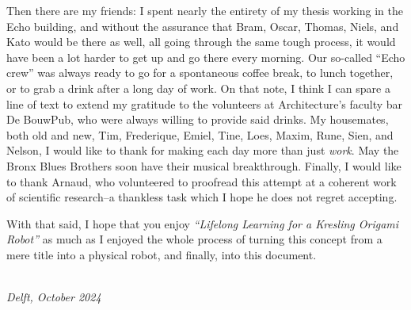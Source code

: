 Then there are my friends:
I spent nearly the entirety of my thesis working in the Echo building, and without the assurance that Bram, Oscar, Thomas, Niels, and Kato would be there as well, all going through the same tough process, it would have been a lot harder to get up and go there every morning.
Our so-called ``Echo crew'' was always ready to go for a spontaneous coffee break, to lunch together, or to grab a drink after a long day of work.
On that note, I think I can spare a line of text to extend my gratitude to the volunteers at Architecture's faculty bar De BouwPub, who were always willing to provide said drinks.
My housemates, both old and new, Tim, Frederique, Emiel, Tine, Loes, Maxim, Rune, Sien, and Nelson, I would like to thank for making each day more than just \emph{work}.
May the Bronx Blues Brothers soon have their musical breakthrough.
Finally, I would like to thank Arnaud, who volunteered to proofread this attempt at a coherent work of scientific research--a thankless task which I hope he does not regret accepting.

With that said, I hope that you enjoy \emph{``Lifelong Learning for a Kresling Origami Robot''} as much as I enjoyed the whole process of turning this concept from a mere title into a physical robot, and finally, into this document.

\begin{flushright}
{\makeatletter\itshape
\@author \\
Delft, October 2024
\makeatother}
\end{flushright}